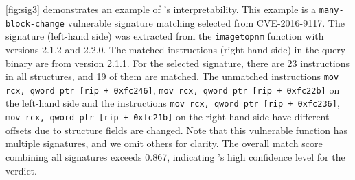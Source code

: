 \autoref{fig:sig3} demonstrates an example of \name's interpretability.
This example is a \texttt{many-block-change} vulnerable signature matching selected from CVE-2016-9117. 
The signature (left-hand side) was extracted from the \texttt{imagetopnm} function with versions 2.1.2 and 2.2.0. 
The matched instructions (right-hand side) in the query binary are from version 2.1.1. 
For the selected signature, there are 23 instructions in all structures, and 19 of them are matched. 
The unmatched instructions \texttt{mov rcx, qword ptr [rip + 0xfc246]}, \texttt{mov rcx, qword ptr [rip + 0xfc22b]} on the left-hand side and the instructions \texttt{mov rcx, qword ptr [rip + 0xfc236]}, \texttt{mov rcx, qword ptr [rip + 0xfc21b]} on the right-hand side have different offsets due to structure fields are changed. 
Note that this vulnerable function has multiple signatures, and we omit others for clarity. 
The overall match score combining all signatures exceeds 0.867, indicating \name's high confidence level for the verdict.


